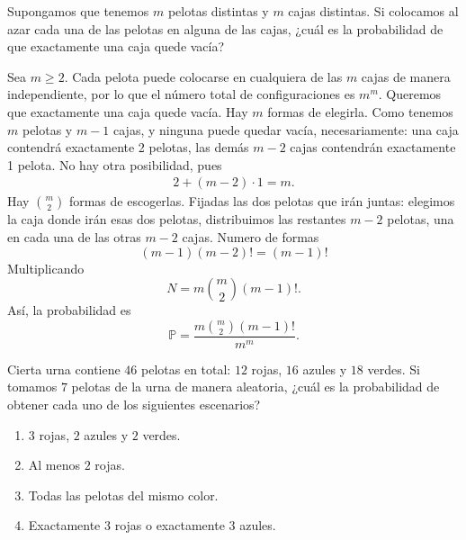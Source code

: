 \documentclass[12pt,a4paper]{article}
\begin{document}
    \begin{mdframed}[style=mdbluebox,frametitle={Ejercicio 6}]
        Supongamos que tenemos $m$ pelotas distintas y $m$ cajas distintas. 
        Si colocamos al azar cada una de las pelotas en alguna de las cajas, 
        ¿cuál es la probabilidad de que exactamente una caja quede vacía?
    \end{mdframed}

    \begin{solucion}
        Sea $m\geq2$. Cada pelota puede colocarse en cualquiera de las $m$ cajas de manera independiente, por lo que
        el número total de configuraciones es $m^{m}$. Queremos que exactamente una caja quede vacía. Hay $m$
        formas de elegirla. Como tenemos $m$ pelotas y $m-1$ cajas, y ninguna puede quedar vacía, necesariamente:
        una caja contendrá exactamente 2 pelotas, las demás $m-2$ cajas contendrán exactamente 1 pelota.
        No hay otra posibilidad, pues
        \begin{align*}
            2+(m-2)\cdot1=m.
        \end{align*}
        Hay $\binom{m}{2}$ formas de escogerlas. Fijadas las dos pelotas que irán juntas: elegimos la caja donde irán esas
        dos pelotas, distribuimos las restantes $m-2$ pelotas, una en cada una de las otras $m-2$ cajas.
        Numero de formas
        \begin{equation*}
            (m-1)(m-2)!=(m-1)!
        \end{equation*}
        Multiplicando
        \begin{equation*}
            N=m\binom{m}{2}(m-1)!.
        \end{equation*}
        Así, la probabilidad es
        \begin{equation*}
            \mathbb{P}=\frac{m\binom{m}{2}(m-1)!}{m^{m}}.
        \end{equation*}
    \end{solucion}

    \begin{mdframed}[style=mdbluebox,frametitle={Ejercicio 7}]
        Cierta urna contiene $46$ pelotas en total: $12$ rojas, $16$ azules y $18$ verdes. 
        Si tomamos $7$ pelotas de la urna de manera aleatoria, 
        ¿cuál es la probabilidad de obtener cada uno de los siguientes escenarios?

        \begin{enumerate}
            \item[(a)] $3$ rojas, $2$ azules y $2$ verdes.
            \item[(b)] Al menos $2$ rojas.
            \item[(c)] Todas las pelotas del mismo color.
            \item[(d)] Exactamente $3$ rojas o exactamente $3$ azules.
        \end{enumerate}
    \end{mdframed}
\end{document}
